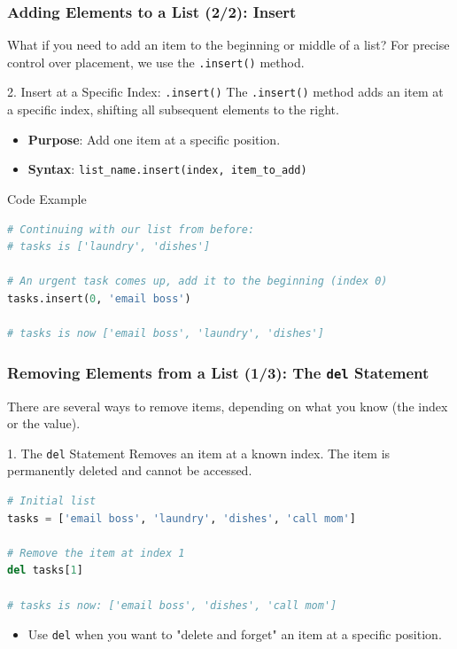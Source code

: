 \documentclass{beamer}
\begin{document}
\begin{frame}[fragile]
    \frametitle{Adding Elements to a List (2/2): Insert}
    
    What if you need to add an item to the beginning or middle of a list? For precise control over placement, we use the \texttt{.insert()} method.

    \begin{block}{2. Insert at a Specific Index: \texttt{.insert()}}
        The \texttt{.insert()} method adds an item at a specific index, shifting all subsequent elements to the right.
        \begin{itemize}
            \item \textbf{Purpose}: Add one item at a specific position.
            \item \textbf{Syntax}: \texttt{list\_name.insert(index, item\_to\_add)}
        \end{itemize}
    \end{block}

    \pause

    \begin{exampleblock}{Code Example}
\begin{lstlisting}[language=Python]
# Continuing with our list from before:
# tasks is ['laundry', 'dishes']

# An urgent task comes up, add it to the beginning (index 0)
tasks.insert(0, 'email boss')

# tasks is now ['email boss', 'laundry', 'dishes']
\end{lstlisting}
    \end{exampleblock}

\end{frame}

\begin{frame}[fragile]
    \frametitle{Removing Elements from a List (1/3): The \texttt{del} Statement}
    
    There are several ways to remove items, depending on what you know (the index or the value).
    
    \begin{block}{1. The \texttt{del} Statement}
        Removes an item at a known index. The item is permanently deleted and cannot be accessed.
        
\begin{lstlisting}[language=Python]
# Initial list
tasks = ['email boss', 'laundry', 'dishes', 'call mom']

# Remove the item at index 1
del tasks[1]

# tasks is now: ['email boss', 'dishes', 'call mom']
\end{lstlisting}
    \end{block}
    
    \begin{itemize}
        \item Use \texttt{del} when you want to "delete and forget" an item at a specific position.
    \end{itemize}
    
\end{frame}
\end{document}
